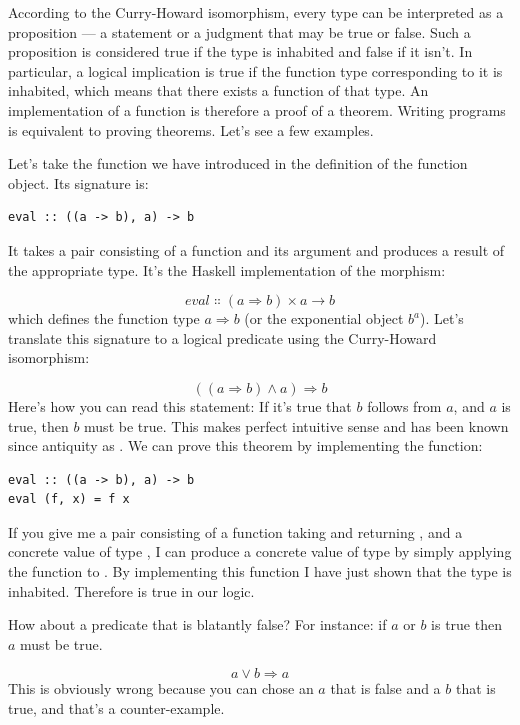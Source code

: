 According to the Curry-Howard isomorphism, every type can be interpreted
as a proposition --- a statement or a judgment that may be true or
false. Such a proposition is considered true if the type is inhabited
and false if it isn't. In particular, a logical implication is true if
the function type corresponding to it is inhabited, which means that
there exists a function of that type. An implementation of a function is
therefore a proof of a theorem. Writing programs is equivalent to
proving theorems. Let's see a few examples.

Let's take the function  we have introduced in the
definition of the function object. Its signature is:

\begin{Verbatim}
eval :: ((a -> b), a) -> b
\end{Verbatim}
It takes a pair consisting of a function and its argument and produces a
result of the appropriate type. It's the Haskell implementation of the
morphism:

\[eval \Colon (a \Rightarrow b) \times a \to b\]
which defines the function type $a \Rightarrow b$ (or the exponential object
$b^{a}$). Let's translate this signature to a logical predicate
using the Curry-Howard isomorphism:

\[((a \Rightarrow b) \wedge a) \Rightarrow b\]
Here's how you can read this statement: If it's true that $b$
follows from $a$, and $a$ is true, then $b$ must be
true. This makes perfect intuitive sense and has been known since
antiquity as . We can prove this theorem by
implementing the function:

\begin{Verbatim}
eval :: ((a -> b), a) -> b
eval (f, x) = f x
\end{Verbatim}
If you give me a pair consisting of a function  taking
 and returning , and a concrete value  of
type , I can produce a concrete value of type  by
simply applying the function  to . By implementing
this function I have just shown that the type
 is inhabited.
Therefore  is true in our logic.

How about a predicate that is blatantly false? For instance: if
$a$ or $b$ is true then $a$ must be true.

\[a \vee b \Rightarrow a\]
This is obviously wrong because you can chose an $a$ that is
false and a $b$ that is true, and that's a counter-example.

